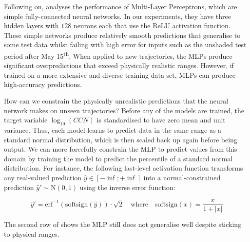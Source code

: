 \newpar Following on,  analyses the performance of Multi-Layer Perceptrons, which are simple fully-connected neural networks. In our experiments, they have three hidden layers with $128$ neurons each that use the ReLU activation function. These simple networks produce relatively smooth predictions that generalise to some test data whilst failing with high error for inputs such as the unshaded test period after May 15\textsuperscript{th}. When applied to new trajectories, the MLPs produce significant overpredictions that exceed physically realistic ranges. However, if trained on a more extensive and diverse training data set, MLPs can produce high-accuracy predictions.

\newpar How can we constrain the physically unrealistic predictions that the neural network makes on unseen trajectories? Before any of the models are trained, the target variable $\log_{10}(CCN)$ is standardised to have zero mean and unit variance. Thus, each model learns to predict data in the same range as a standard normal distribution, which is then scaled back up again before being output. We can more forcefully constrain the MLP to predict values from this domain by training the model to predict the percentile of a standard normal distribution. For instance, the following last-level activation function transforms any real-valued prediction $\hat{y} \in [-\inf; +\inf]$ into a normal-constrained prediction $\hat{y}' \sim \text{N}(0, 1)$ using the inverse error function:

\begin{equation*}
    \hat{y}' = \text{erf}^{-1} \left( \text{softsign}(\hat{y}) \right) \cdot \sqrt{2} \quad \text{where} \quad \text{softsign}(x) = \frac{x}{1 + |x|}
\end{equation*}

\noindent The second row of  shows the MLP still does not generalise well despite sticking to physical ranges.

